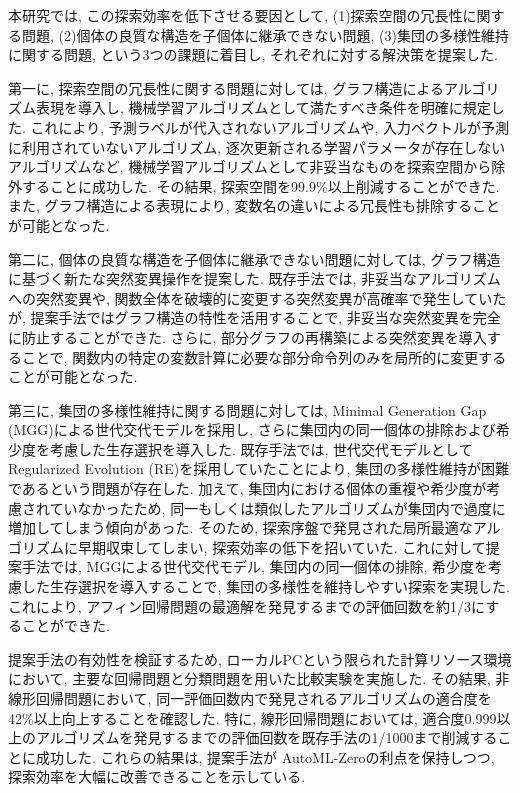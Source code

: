 \documentclass[11pt,oneside,openany,report]{jsbook}
\begin{document}
本研究では, この探索効率を低下させる要因として, (1)探索空間の冗長性に関する問題, (2)個体の良質な構造を子個体に継承できない問題, (3)集団の多様性維持に関する問題, という3つの課題に着目し, それぞれに対する解決策を提案した.

第一に, 探索空間の冗長性に関する問題に対しては, グラフ構造によるアルゴリズム表現を導入し, 機械学習アルゴリズムとして満たすべき条件を明確に規定した. これにより, 予測ラベルが代入されないアルゴリズムや, 入力ベクトルが予測に利用されていないアルゴリズム, 逐次更新される学習パラメータが存在しないアルゴリズムなど, 機械学習アルゴリズムとして非妥当なものを探索空間から除外することに成功した. その結果, 探索空間を99.9\%以上削減することができた. また, グラフ構造による表現により, 変数名の違いによる冗長性も排除することが可能となった.

第二に, 個体の良質な構造を子個体に継承できない問題に対しては, グラフ構造に基づく新たな突然変異操作を提案した. 既存手法では, 非妥当なアルゴリズムへの突然変異や, 関数全体を破壊的に変更する突然変異が高確率で発生していたが, 提案手法ではグラフ構造の特性を活用することで, 非妥当な突然変異を完全に防止することができた. さらに, 部分グラフの再構築による突然変異を導入することで, 関数内の特定の変数計算に必要な部分命令列のみを局所的に変更することが可能となった.

第三に, 集団の多様性維持に関する問題に対しては, Minimal Generation Gap (MGG)による世代交代モデルを採用し, さらに集団内の同一個体の排除および希少度を考慮した生存選択を導入した. 既存手法では, 世代交代モデルとしてRegularized Evolution (RE)を採用していたことにより, 集団の多様性維持が困難であるという問題が存在した. 加えて, 集団内における個体の重複や希少度が考慮されていなかったため, 同一もしくは類似したアルゴリズムが集団内で過度に増加してしまう傾向があった. そのため, 探索序盤で発見された局所最適なアルゴリズムに早期収束してしまい, 探索効率の低下を招いていた. これに対して提案手法では, MGGによる世代交代モデル, 集団内の同一個体の排除, 希少度を考慮した生存選択を導入することで, 集団の多様性を維持しやすい探索を実現した. これにより, アフィン回帰問題の最適解を発見するまでの評価回数を約1/3にすることができた.

提案手法の有効性を検証するため, ローカルPCという限られた計算リソース環境において, 主要な回帰問題と分類問題を用いた比較実験を実施した. その結果, 非線形回帰問題において, 同一評価回数内で発見されるアルゴリズムの適合度を42\%以上向上することを確認した. 特に, 線形回帰問題においては, 適合度0.999以上のアルゴリズムを発見するまでの評価回数を既存手法の1/1000まで削減することに成功した. これらの結果は, 提案手法が AutoML-Zeroの利点を保持しつつ, 探索効率を大幅に改善できることを示している.
\end{document}
